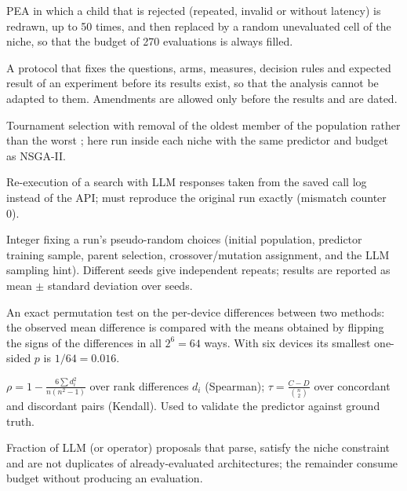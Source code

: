 \documentclass[pdflatex,sn-mathphys-num]{sn-jnl}
\begin{document}
\begin{appendices}
\begin{description}[style=nextline,leftmargin=0pt,itemsep=3pt]
\item[PEA with refilling.] PEA in which a child that is rejected (repeated, invalid or without latency) is redrawn, up to 50 times, and then replaced by a random unevaluated cell of the niche, so that the budget of 270 evaluations is always filled.

\item[Pre-registration.] A protocol that fixes the questions, arms, measures, decision rules and expected result of an experiment before its results exist, so that the analysis cannot be adapted to them. Amendments are allowed only before the results and are dated.

\item[Regularised (aging) evolution.] Tournament selection with removal of the oldest member of the population rather than the worst \cite{real19}; here run inside each niche with the same predictor and budget as NSGA-II.

\item[Replay.] Re-execution of a search with LLM responses taken from the saved call log instead of the API; must reproduce the original run exactly (mismatch counter 0).

\item[Seed.] Integer fixing a run's pseudo-random choices (initial population, predictor training sample, parent selection, crossover/mutation assignment, and the LLM sampling hint). Different seeds give independent repeats; results are reported as mean $\pm$ standard deviation over seeds.

\item[Sign-flip test.] An exact permutation test on the per-device differences between two methods: the observed mean difference is compared with the means obtained by flipping the signs of the differences in all $2^6=64$ ways. With six devices its smallest one-sided $p$ is $1/64=0.016$.

\item[Spearman / Kendall rank correlation.] $\rho=1-\frac{6\sum d_i^2}{n(n^2-1)}$ over rank differences $d_i$ (Spearman); $\tau=\frac{C-D}{\binom{n}{2}}$ over concordant and discordant pairs (Kendall). Used to validate the predictor against ground truth.

\item[Usable proposal rate.] Fraction of LLM (or operator) proposals that parse, satisfy the niche constraint and are not duplicates of already-evaluated architectures; the remainder consume budget without producing an evaluation.


\end{description}
\end{appendices}
\end{document}
